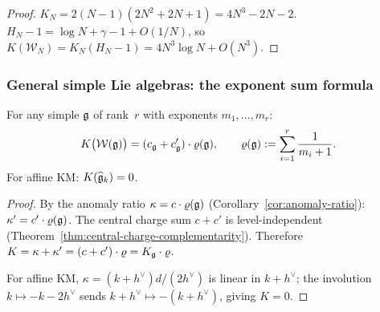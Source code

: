 \begin{proof}
$K_N = 2(N-1)(2N^2+2N+1) = 4N^3 - 2N - 2$.
$H_N - 1 = \log N + \gamma - 1 + O(1/N)$, so
$K(\mathcal{W}_N) = K_N(H_N - 1) = 4N^3 \log N + O(N^3)$.
\end{proof}

\subsubsection{General simple Lie algebras: the exponent sum formula}

\begin{theorem}
\label{thm:thqg-IV-exponent-sum}
For any simple $\mathfrak{g}$ of rank~$r$ with exponents $m_1, \ldots, m_r$:
\begin{equation}\label{eq:thqg-IV-exponent-sum}
K\bigl(\mathcal{W}(\mathfrak{g})\bigr)
= (c_{\mathfrak{g}} + c_{\mathfrak{g}}') \cdot \varrho(\mathfrak{g}),
\qquad
\varrho(\mathfrak{g}) := \sum_{i=1}^r \frac{1}{m_i + 1}.
\end{equation}
For affine KM: $K(\widehat{\mathfrak{g}}_k) = 0$.
\end{theorem}

\begin{proof}
By the anomaly ratio $\kappa = c \cdot \varrho(\mathfrak{g})$
(Corollary~\ref{cor:anomaly-ratio}): $\kappa' = c' \cdot \varrho(\mathfrak{g})$.
The central charge sum $c + c'$ is level-independent
(Theorem~\ref{thm:central-charge-complementarity}).
Therefore $K = \kappa + \kappa' = (c + c') \cdot \varrho = K_{\mathfrak{g}} \cdot \varrho$.

For affine KM, $\kappa = (k+h^\vee)d/(2h^\vee)$ is linear in
$k + h^\vee$; the involution $k \mapsto -k - 2h^\vee$ sends
$k + h^\vee \mapsto -(k + h^\vee)$, giving $K = 0$.
\end{proof}

